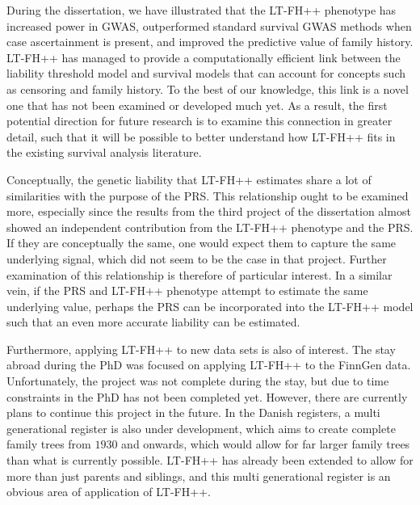 During the dissertation, we have illustrated that the LT-FH++ phenotype has increased power in GWAS, outperformed standard survival GWAS methods when case ascertainment is present, and improved the predictive value of family history. LT-FH++ has managed to provide a computationally efficient link between the liability threshold model and survival models that can account for concepts such as censoring and family history. To the best of our knowledge, this link is a novel one that has not been examined or developed much yet. As a result, the first potential direction for future research is to examine this connection in greater detail, such that it will be possible to better understand how LT-FH++ fits in the existing survival analysis literature.

Conceptually, the genetic liability that LT-FH++ estimates share a lot of similarities with the purpose of the PRS. This relationship ought to be examined more, especially since the results from the third project of the dissertation almost showed an independent contribution from the LT-FH++ phenotype and the PRS. If they are conceptually the same, one would expect them to capture the same underlying signal, which did not seem to be the case in that project. Further examination of this relationship is therefore of particular interest. In a similar vein, if the PRS and LT-FH++ phenotype attempt to estimate the same underlying value, perhaps the PRS can be incorporated into the LT-FH++ model such that an even more accurate liability can be estimated.

Furthermore, applying LT-FH++ to new data sets is also of interest. The stay abroad during the PhD was focused on applying LT-FH++ to the FinnGen data. Unfortunately, the project was not complete during the stay, but due to time constraints in the PhD has not been completed yet. However, there are currently plans to continue this project in the future. In the Danish registers, a multi generational register is also under development, which aims to create complete family trees from $ 1930 $ and onwards, which would allow for far larger family trees than what is currently possible. LT-FH++ has already been extended to allow for more than just parents and siblings, and this multi generational register is an obvious area of application of LT-FH++. 


